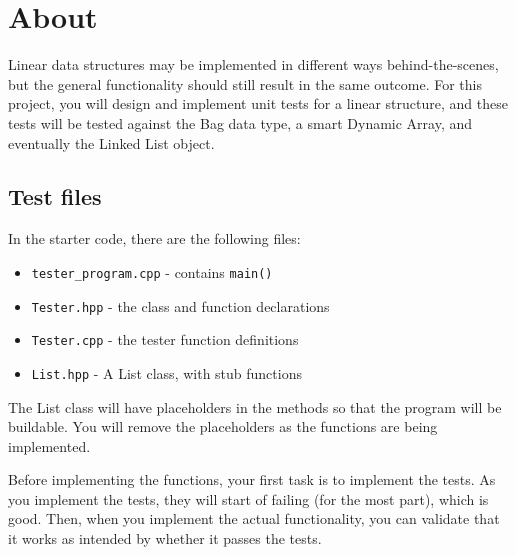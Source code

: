 
\newcommand{\laClass}       {CS 250}
\newcommand{\laSemester}    {Spring 2018}
\newcommand{\laChapter}     {}
\newcommand{\laType}        {Project}
\newcommand{\laAssignment}  {1}
\newcommand{\laPoints}      {5}
\newcommand{\laTitle}       {Unit Tests for Linear Structures}
\newcommand{\laStarterFiles}{Download from GitHub.}
\newcommand{\laTopics}      {Design, testing, UML, unit tests}
\setcounter{chapter}{1}
\setcounter{section}{1}
\addtocounter{section}{-1}
\toggletrue{answerkey}
\togglefalse{answerkey}




    \section{About}

    Linear data structures may be implemented in different ways behind-the-scenes,
    but the general functionality should still result in the same outcome.
    For this project, you will design and implement unit tests for a linear structure,
    and these tests will be tested against the Bag data type, a smart Dynamic Array,
    and eventually the Linked List object.

    \subsection{Test files}

    In the starter code, there are the following files:

    \begin{itemize}
        \item   \texttt{tester\_program.cpp} - contains \texttt{main()}
        \item   \texttt{Tester.hpp} - the class and function declarations
        \item   \texttt{Tester.cpp} - the tester function definitions
        \item   \texttt{List.hpp} - A List class, with stub functions
    \end{itemize}

    The List class will have placeholders in the methods so that the program
    will be buildable. You will remove the placeholders as the functions are
    being implemented.

    Before implementing the functions, your first task is to implement the tests.
    As you implement the tests, they will start of failing (for the most part),
    which is good. Then, when you implement the actual functionality, you can
    validate that it works as intended by whether it passes the tests.

